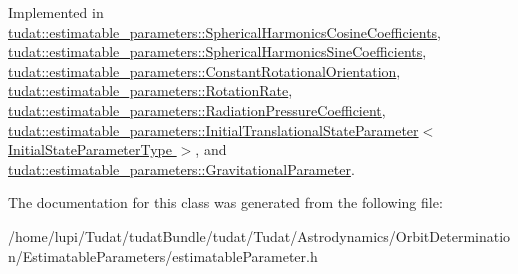 Implemented in \hyperlink{classtudat_1_1estimatable__parameters_1_1SphericalHarmonicsCosineCoefficients_a83b148618a4198a251bf8c651c19427b}{tudat\+::estimatable\+\_\+parameters\+::\+Spherical\+Harmonics\+Cosine\+Coefficients}, \hyperlink{classtudat_1_1estimatable__parameters_1_1SphericalHarmonicsSineCoefficients_addf046d353ecbacb2564945ef44e7a42}{tudat\+::estimatable\+\_\+parameters\+::\+Spherical\+Harmonics\+Sine\+Coefficients}, \hyperlink{classtudat_1_1estimatable__parameters_1_1ConstantRotationalOrientation_a7bd1cbe847e0d1db60c8cd8e3f6c5943}{tudat\+::estimatable\+\_\+parameters\+::\+Constant\+Rotational\+Orientation}, \hyperlink{classtudat_1_1estimatable__parameters_1_1RotationRate_afad73852fa105de2616b9be5c607f489}{tudat\+::estimatable\+\_\+parameters\+::\+Rotation\+Rate}, \hyperlink{classtudat_1_1estimatable__parameters_1_1RadiationPressureCoefficient_afa6dd3600b17a9d92c64c804e3596319}{tudat\+::estimatable\+\_\+parameters\+::\+Radiation\+Pressure\+Coefficient}, \hyperlink{classtudat_1_1estimatable__parameters_1_1InitialTranslationalStateParameter_a99775f766b178257618227c2f03d7d72}{tudat\+::estimatable\+\_\+parameters\+::\+Initial\+Translational\+State\+Parameter$<$ Initial\+State\+Parameter\+Type $>$}, and \hyperlink{classtudat_1_1estimatable__parameters_1_1GravitationalParameter_ab1610caa2f08b3b4988d56f60ab9ac89}{tudat\+::estimatable\+\_\+parameters\+::\+Gravitational\+Parameter}.



The documentation for this class was generated from the following file\+:\begin{DoxyCompactItemize}
\item 
/home/lupi/\+Tudat/tudat\+Bundle/tudat/\+Tudat/\+Astrodynamics/\+Orbit\+Determination/\+Estimatable\+Parameters/estimatable\+Parameter.\+h\end{DoxyCompactItemize}
